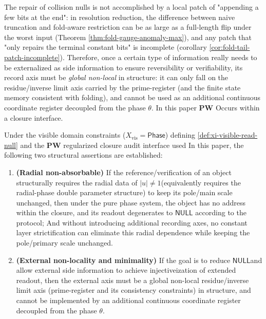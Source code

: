 \begin{remark}\label{rem:xi-register-minimality-no-tail-patch}
The repair of collision nulls is not accomplished by a local patch of "appending a few bits at the end": in resolution reduction, the difference between naive truncation and fold-aware restriction can be as large as a full-length flip under the worst input (Theorem \ref{thm:fold-gauge-anomaly-max}), and any patch that "only repairs the terminal constant bits" is incomplete (corollary \ref{cor:fold-tail-patch-incomplete}).
Therefore, once a certain type of information really needs to be externalized as side information to ensure reversibility or verifiability, its record axis must be \emph{global non-local} in structure: it can only fall on the residue/inverse limit axis carried by the prime-register (and the finite state memory consistent with folding), and cannot be used as an additional continuous coordinate register decoupled from the phase \(\theta\). In this paper \(\mathbf{PW}\) Occurs within a closure interface.
\end{remark}

\begin{theorem}\label{thm:xi-pw-no-continuous-hair}
Under the visible domain constraints (\(X_{\mathrm{vis}}=\mathsf{Phase}\)) defining \ref{def:xi-visible-read-null} and the \(\mathbf{PW}\) regularized closure audit interface used In this paper, the following two structural assertions are established:
\begin{enumerate}
  \item ​​\textbf{(Radial non-absorbable)}
  If the reference/verification of an object structurally requires the radial data of \(|u|\neq 1\) ​​(equivalently requires the radial-phase double parameter structure) to keep its pole/main scale unchanged, then under the pure phase system, the object has no address within the closure, and its readout degenerates to \(\mathsf{NULL}\) according to the protocol;
  And without introducing additional recording axes, no constant layer strictification can eliminate this radial dependence while keeping the pole/primary scale unchanged.
  \item ​​\textbf{(External non-locality and minimality)}
  If the goal is to reduce \(\mathsf{NULL}\) ​​and allow external side information to achieve injectiveization of extended readout, then the external axis must be a global non-local residue/inverse limit axis (prime-register and its consistency constraints) in structure, and cannot be implemented by an additional continuous coordinate register decoupled from the phase \(\theta\).
\end{enumerate}
\end{theorem}

